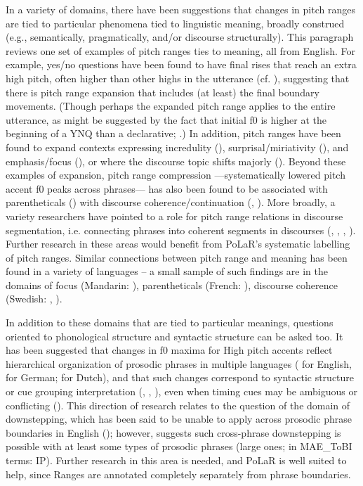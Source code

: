 \documentclass[11pt, twoside]{memoir}
\begin{document}
In a variety of domains, there have been suggestions that changes in pitch ranges are tied to particular phenomena tied to linguistic meaning, broadly construed (e.g., semantically, pragmatically, and/or discourse structurally). This paragraph reviews one set of examples of pitch ranges ties to meaning, all from English. For example, yes/no questions have been found to have final rises that reach an extra high pitch, often higher than other highs in the utterance (cf. \citealt{pierrehumbert80}), suggesting that there is pitch range expansion that includes (at least) the final boundary movements. (Though perhaps the expanded pitch range applies to the entire utterance, as might be  suggested by the fact that initial f0 is higher at the beginning of a YNQ than a declarative; \citealt{sicoli-15}.) In addition, pitch ranges have been found to expand contexts expressing incredulity (\citealt{hirschbergward92}), surprisal\slash miriativity (\citealt{rett-20}), and emphasis\slash focus (\citealt{xuxu05}), or where the discourse topic shifts majorly (\citealt{hirschbergpierrehumbert86}). Beyond these examples of expansion, pitch range compression —systematically lowered pitch accent f0 peaks across phrases— has also been found to be associated with parentheticals (\citealt{price-91, dehe09}) with discourse coherence\slash continuation (\citealt{beckman93}, \citealt{bruce-97}). More broadly, a variety researchers have pointed to a role for pitch range relations in discourse segmentation, i.e. connecting phrases into coherent segments in discourses (\citealt{hirst93a}, \citealt{wichmann00}, \citealt{hirschberg04}, \citealt{lin-11}). Further research in these areas would benefit from PoLaR’s systematic labelling of pitch ranges.  Similar connections between pitch range and meaning has been found in a variety of languages – a small sample of such findings are in the domains of focus (Mandarin: \citealt{xu99}), parentheticals (French: \citealt{fagyal02}), discourse coherence (Swedish: \citealt{hansson03}, \citealt{carlson-05}).

In addition to these domains that are tied to particular meanings, questions oriented to phonological structure and syntactic structure can be asked too. It has been suggested that changes in f0 maxima for High pitch accents reflect hierarchical organization of prosodic phrases in multiple languages (\citealt{ladd88} for English, \citealt{fery-05} for German; \citealt{berg-92} for Dutch), and that such changes correspond to syntactic structure or cue grouping interpretation (\citealt{ladd88, ladd92}, \citealt{fery-05}, \citealt{kentnerfery13}), even when timing cues may be ambiguous or conflicting (\citealt{brugos15}). This direction of research relates to the question of the domain of downstepping, which has been said to be unable to apply across prosodic phrase boundaries in English (\citealt{beckmanayers97}); however, \citealt{sturman19} suggests such cross-phrase downstepping is possible with at least some types of prosodic phrases (large ones; in MAE\_ToBI terms: IP). Further research in this area is needed, and PoLaR is well suited to help, since Ranges are annotated completely separately from phrase boundaries.
\end{document}

